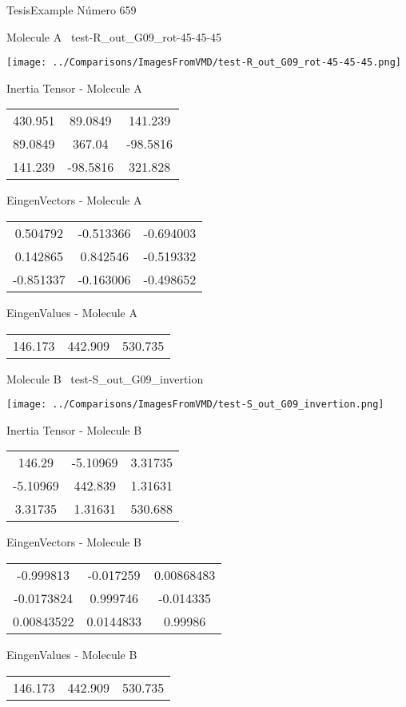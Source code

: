 \vtab[-3cm]
\begin{center}
{\large TesisExample \tab Número 659}
\end{center}
\begin{multicols}{2}
\begin{center}

Molecule A \
test-R\_out\_G09\_rot-45-45-45

\texttt{[image: ../Comparisons/ImagesFromVMD/test-R\_out\_G09\_rot-45-45-45.png]}

Inertia Tensor - Molecule A \\
\begin{tabular}{|c c c|}
430.951	 & 	89.0849	 & 	141.239	 \\
89.0849	 & 	367.04	 & 	-98.5816	 \\
141.239	 & 	-98.5816	 & 	321.828
\end{tabular}

\vtab
 EingenVectors - Molecule A     \\
\begin{tabular}{|c c c|}
0.504792	 & 	-0.513366	 & 	-0.694003	 \\
0.142865	 & 	0.842546	 & 	-0.519332	 \\
-0.851337	 & 	-0.163006	 & 	-0.498652
\end{tabular}

\vtab
 EingenValues - Molecule A     \\
\begin{tabular}{|c c c|}
146.173	 & 	442.909	 & 	530.735	 \\
\end{tabular}
\columnbreak

Molecule B \
test-S\_out\_G09\_invertion

\texttt{[image: ../Comparisons/ImagesFromVMD/test-S\_out\_G09\_invertion.png]}

Inertia Tensor - Molecule B \\
\begin{tabular}{|c c c|}
146.29	 & 	-5.10969	 & 	3.31735	 \\
-5.10969	 & 	442.839	 & 	1.31631	 \\
3.31735	 & 	1.31631	 & 	530.688
\end{tabular}

\vtab
 EingenVectors - Molecule B     \\
\begin{tabular}{|c c c|}
-0.999813	 & 	-0.017259	 & 	0.00868483	 \\
-0.0173824	 & 	0.999746	 & 	-0.014335	 \\
0.00843522	 & 	0.0144833	 & 	0.99986
\end{tabular}

\vtab
 EingenValues - Molecule B     \\
\begin{tabular}{|c c c|}
146.173	 & 	442.909	 & 	530.735	 \\
\end{tabular}

\end{center}
\end{multicols}

